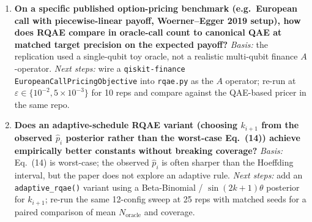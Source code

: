 \begin{enumerate}
\item \textbf{On a specific published option-pricing benchmark (e.g.\
European call with piecewise-linear payoff, Woerner--Egger 2019 setup),
how does RQAE compare in oracle-call count to canonical QAE at matched
target precision on the expected payoff?} \emph{Basis:} the replication
used a single-qubit toy oracle, not a realistic multi-qubit finance
$A$-operator. \emph{Next steps:} wire a \texttt{qiskit-finance}
\texttt{EuropeanCallPricingObjective} into \texttt{rqae.py} as the $A$
operator; re-run at $\varepsilon \in \{10^{-2}, 5 \times 10^{-3}\}$ for
10 reps and compare against the QAE-based pricer in the same repo.

\item \textbf{Does an adaptive-schedule RQAE variant (choosing $k_{i+1}$
from the observed $\hat{p}_i$ posterior rather than the worst-case
Eq.~(14)) achieve empirically better constants without breaking coverage?}
\emph{Basis:} Eq.~(14) is worst-case; the observed $\hat{p}_i$ is often
sharper than the Hoeffding interval, but the paper does not explore an
adaptive rule. \emph{Next steps:} add an \texttt{adaptive\_rqae()} variant
using a Beta-Binomial / $\sin(2k+1)\theta$ posterior for $k_{i+1}$; re-run
the same 12-config sweep at 25 reps with matched seeds for a paired
comparison of mean $N_{\text{oracle}}$ and coverage.

\end{enumerate}
